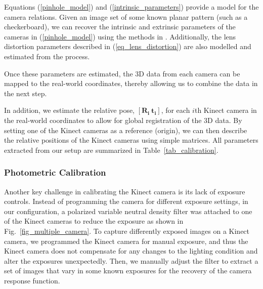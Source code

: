 Equations (\ref{pinhole_model}) and (\ref{intrinsic_parameters}) provide a model for the camera relations. Given an image set of some known planar pattern (such as a checkerboard), we can recover the intrinsic and extrinsic parameters of the cameras in (\ref{pinhole_model}) using the methods in \cite{zhang2000flexible}. Additionally, the lens distortion parameters described in (\ref{eq_lens_distortion}) are also modelled and estimated from the process.

Once these parameters are estimated, the 3D data from each camera can be mapped to the real-world coordinates, thereby allowing us to combine the data in the next step. 


In addition, we estimate the relative pose, $[\mathbf{R_{i}~ t_{i}}]$, for each $i$th Kinect camera in the real-world coordinates to allow for global registration of the 3D data. By setting one of the Kinect cameras as a reference (origin), we can then describe the relative positions of the Kinect cameras using simple matrices. All parameters extracted from our setup are summarized in Table~\ref{tab_calibration}.

\subsubsection{Photometric Calibration}
Another key challenge in calibrating the Kinect camera is its lack of exposure controls. Instead of programming the camera for different exposure settings, in our configuration, a polarized variable neutral density filter was attached to one of the Kinect cameras to reduce the exposure as shown in Fig.~\ref{fig_multiple_camera}. To capture differently exposed images on a Kinect camera, we programmed the Kinect camera for manual exposure, and thus the Kinect camera does not compensate for any changes to the lighting condition and alter the exposures unexpectedly.  Then, we manually adjust the filter to extract a set of images that vary in some known exposures for the recovery of the camera response function\cite{mann1993compositing}.


